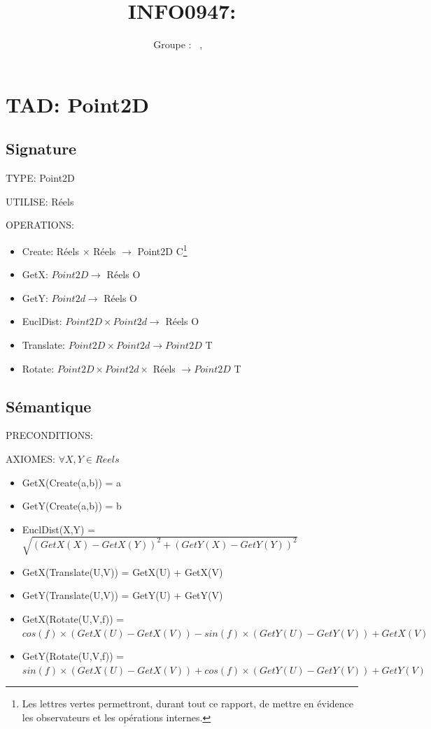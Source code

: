 \documentclass[a4paper, 11pt, oneside]{article}
\title{INFO0947: \intitule}
\author{Groupe \GrNbr : \PrenomUN~\textsc{\NomUN}, \PrenomDEUX~\textsc{\NomDEUX}}
\date{}
\newcommand{\tablemat}{~}
\renewcommand{\tablemat}{\tableofcontents}
\begin{document}
\maketitle
\newpage
\tablemat
\newpage



\section{TAD: Point2D}

\subsection{Signature}

\noindent TYPE: Point2D

\noindent UTILISE: Réels 

\noindent OPERATIONS: 
\begin{itemize}
    \item Create: Réels $\times$ Réels $\xrightarrow{}$ Point2D {\color{green} C}\footnote{Les lettres vertes permettront, durant tout ce rapport, de mettre en évidence les observateurs et les opérations internes.}
    \item GetX: $Point2D \xrightarrow{}$ Réels {\color{green} O}
    \item GetY: $Point2d \xrightarrow{}$ Réels {\color{green} O}
    \item EuclDist: $Point2D \times Point2d \xrightarrow{}$ Réels {\color{green} O}
    \item Translate: $Point2D \times Point2d \xrightarrow{} Point2D$ {\color{green} T}
    \item Rotate: $Point2D \times Point2d  \times $ Réels $\xrightarrow{} Point2D $ {\color{green} T}
\end{itemize}



\subsection{Sémantique}
\noindent PRECONDITIONS:

\noindent AXIOMES: 
$\forall X,Y \in Reels$
\begin{itemize}
    \item GetX(Create(a,b)) = a
    \item GetY(Create(a,b)) = b
    \item EuclDist(X,Y) = $\sqrt{{(GetX(X)-GetX(Y))}^{2}+{(GetY(X)-GetY(Y))}^{2}}$
    \item GetX(Translate(U,V)) = GetX(U) + GetX(V)
    \item GetY(Translate(U,V)) = GetY(U) + GetY(V)
    \item GetX(Rotate(U,V,f)) = $cos(f) \times (GetX(U)-GetX(V)) - sin(f) \times (GetY(U)-GetY(V)) + GetX(V) $ 
    \item GetY(Rotate(U,V,f)) = $sin(f) \times (GetX(U)-GetX(V)) + cos(f) \times (GetY(U)-GetY(V)) + GetY(V) $ 
    
    
    
\end{itemize}
\end{document}
